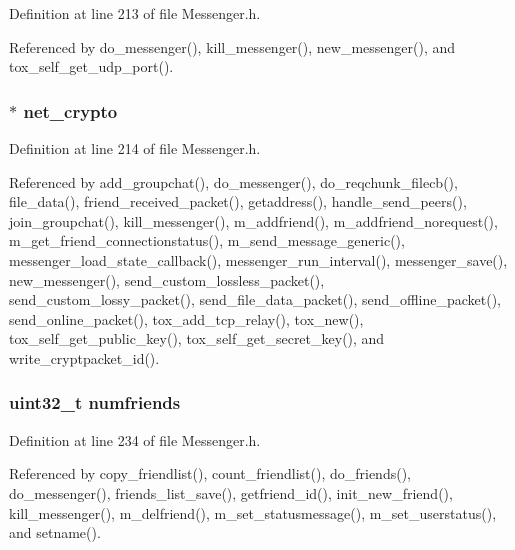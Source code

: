 Definition at line 213 of file Messenger.\+h.



Referenced by do\+\_\+messenger(), kill\+\_\+messenger(), new\+\_\+messenger(), and tox\+\_\+self\+\_\+get\+\_\+udp\+\_\+port().

\hypertarget{struct_messenger_ab06a41217a1e9b5985555e19e088ae94}{
\subsubsection[{net\+\_\+crypto}]{$\ast$ net\+\_\+crypto}}\label{struct_messenger_ab06a41217a1e9b5985555e19e088ae94}


Definition at line 214 of file Messenger.\+h.



Referenced by add\+\_\+groupchat(), do\+\_\+messenger(), do\+\_\+reqchunk\+\_\+filecb(), file\+\_\+data(), friend\+\_\+received\+\_\+packet(), getaddress(), handle\+\_\+send\+\_\+peers(), join\+\_\+groupchat(), kill\+\_\+messenger(), m\+\_\+addfriend(), m\+\_\+addfriend\+\_\+norequest(), m\+\_\+get\+\_\+friend\+\_\+connectionstatus(), m\+\_\+send\+\_\+message\+\_\+generic(), messenger\+\_\+load\+\_\+state\+\_\+callback(), messenger\+\_\+run\+\_\+interval(), messenger\+\_\+save(), new\+\_\+messenger(), send\+\_\+custom\+\_\+lossless\+\_\+packet(), send\+\_\+custom\+\_\+lossy\+\_\+packet(), send\+\_\+file\+\_\+data\+\_\+packet(), send\+\_\+offline\+\_\+packet(), send\+\_\+online\+\_\+packet(), tox\+\_\+add\+\_\+tcp\+\_\+relay(), tox\+\_\+new(), tox\+\_\+self\+\_\+get\+\_\+public\+\_\+key(), tox\+\_\+self\+\_\+get\+\_\+secret\+\_\+key(), and write\+\_\+cryptpacket\+\_\+id().

\hypertarget{struct_messenger_a476f4b36bd078632dd434e76df29d922}{
\subsubsection[{numfriends}]{\setlength{\rightskip}{0pt plus 5cm}uint32\+\_\+t numfriends}}\label{struct_messenger_a476f4b36bd078632dd434e76df29d922}


Definition at line 234 of file Messenger.\+h.



Referenced by copy\+\_\+friendlist(), count\+\_\+friendlist(), do\+\_\+friends(), do\+\_\+messenger(), friends\+\_\+list\+\_\+save(), getfriend\+\_\+id(), init\+\_\+new\+\_\+friend(), kill\+\_\+messenger(), m\+\_\+delfriend(), m\+\_\+set\+\_\+statusmessage(), m\+\_\+set\+\_\+userstatus(), and setname().

